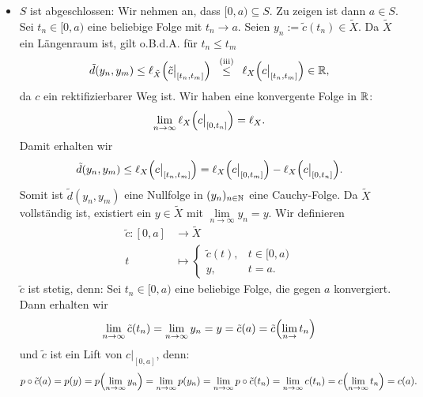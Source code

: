 \begin{beweis}
\begin{itemize}
\begin{figure}[h]
		\end{figure}
	
		\item $S$ ist abgeschlossen:
		Wir nehmen an, dass $[0,a) \subseteq S$.
		Zu zeigen ist dann $a \in S$.
		Sei $t_n \in [0,a)$ eine beliebige Folge mit $t_n \rightarrow a$.
		Seien $y_n := \tilde{c}(t_n) \in \tilde{X}$.
		Da $\tilde{X}$ ein Längenraum ist, gilt o.B.d.A. für $t_n \leq t_m$
		\[
			\tilde{d}(y_n,y_m) \leq \ell_{\tilde{X}} \enbrace*{\tilde{c}\big|_{[t_n,t_m]}} \stack{\text{(iii)}}{\leq} \ell_X \enbrace*{c \big|_{[t_n,t_m]}} \in \RR,
		\]
		da $c$ ein rektifizierbarer Weg ist.
		Wir haben eine konvergente Folge in $\mathbb{R}$:
		\[
			\lim\limits_{n \rightarrow \infty} \ell_X \enbrace*{c \big|_{[0,t_n]}} = \ell_X.
		\]
		Damit erhalten wir
		\[
			\tilde{d}(y_n,y_m) \leq \ell_X\enbrace*{c \big|_{[t_n,t_m]}} = \ell_X \enbrace*{c \big|_{[0,t_m]}} - \ell_X \enbrace*{c \big|_{[0,t_n]}}.
		\]
		Somit ist $\tilde{d}(y_n,y_m)$ eine Nullfolge in $(y_n)_{n \in \mathbb{N}}$ eine Cauchy-Folge.
		Da $\tilde{X}$ vollständig ist, existiert ein $y \in \tilde{X}$ mit $\lim\limits_{n \rightarrow \infty} y_n = y$.
		Wir definieren
		\begin{align*}
			\tilde{c}\colon [0,a] &\longrightarrow \tilde{X} \\
			t &\longmapsto \begin{cases}
				\tilde{c}(t), & t \in [0,a) \\
				y, & t = a.
			\end{cases}
		\end{align*}
		$\tilde{c}$ ist stetig, denn:
		Sei $t_n \in [0,a)$ eine beliebige Folge, die gegen $a$ konvergiert.
		Dann erhalten wir
		\[
			\lim\limits_{n \rightarrow \infty} \tilde{c}(t_n) = \lim\limits_{n \rightarrow \infty} y_n = y = \tilde{c}(a) = \tilde{c}\enbrace*{\lim\limits_{n \rightarrow} t_n}
		\]
		und $\tilde{c}$ ist ein Lift von $c \big|_{[0,a]}$, denn:
		\[
			p \circ \tilde{c}(a) = p(y) = p \enbrace*{\lim\limits_{n \rightarrow \infty} y_n} = \lim\limits_{n \rightarrow \infty} p(y_n) = \lim\limits_{n \rightarrow \infty} p \circ \tilde{c}(t_n) = \lim\limits_{n \rightarrow \infty} c(t_n) = c \enbrace*{\lim\limits_{n \rightarrow \infty} t_n} = c(a).
\]
\end{itemize}
\end{beweis}
